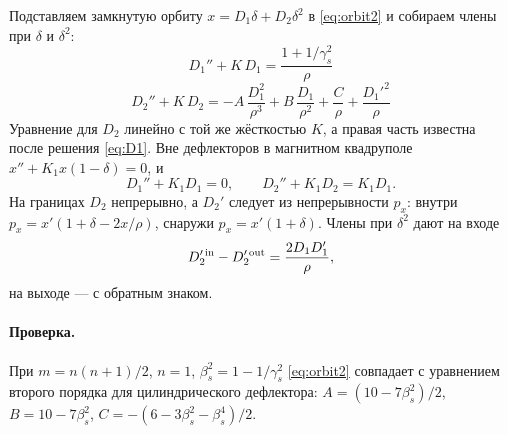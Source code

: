 \documentclass[12pt,a4paper]{article}
\numberwithin{equation}{section}
\begin{document}
Подставляем замкнутую орбиту $x=D_1\delta+D_2\delta^2$ в \eqref{eq:orbit2} и собираем члены
при $\delta$ и $\delta^2$:
\begin{equation}\label{eq:D1}
\boxed{D_1''+K\,D_1=\frac{1+1/\gamma_s^2}{\rho}}
\end{equation}
\begin{equation}\label{eq:D2}
\boxed{D_2''+K\,D_2=-A\,\frac{D_1^2}{\rho^3}+B\,\frac{D_1}{\rho^2}+\frac{C}{\rho}+\frac{D_1'^2}{\rho}}
\end{equation}
Уравнение для $D_2$ линейно с той же жёсткостью $K$, а правая часть известна после решения
\eqref{eq:D1}. Вне дефлекторов в магнитном квадруполе $x''+K_1x(1-\delta)=0$, и
\begin{equation}
D_1''+K_1D_1=0,\qquad D_2''+K_1D_2=K_1D_1 .
\end{equation}
На границах $D_2$ непрерывно, а $D_2'$ следует из непрерывности $p_x$: внутри
$p_x=x'(1+\delta-2x/\rho)$, снаружи $p_x=x'(1+\delta)$. Члены при $\delta^2$ дают на входе
\begin{equation}
D_2'^{\,\rm in}-D_2'^{\,\rm out}=\frac{2D_1D_1'}{\rho},
\end{equation}
на выходе --- с обратным знаком.

\paragraph{Проверка.} При $m=n(n+1)/2$, $n=1$, $\beta_s^2=1-1/\gamma_s^2$
\eqref{eq:orbit2} совпадает с уравнением второго порядка для цилиндрического дефлектора:
$A=(10-7\beta_s^2)/2$, $B=10-7\beta_s^2$, $C=-(6-3\beta_s^2-\beta_s^4)/2$.
\end{document}
